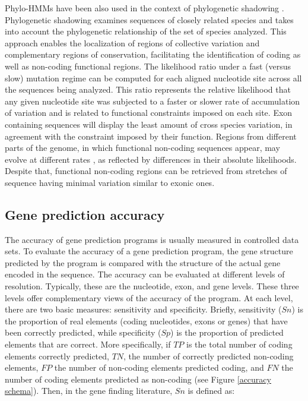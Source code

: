 Phylo-HMMs have been also used in the context of phylogenetic
shadowing \citep{boffelli:2003a}. Phylogenetic shadowing examines
sequences of closely related species and takes into account the
phylogenetic relationship of the set of species analyzed. This
approach enables the localization of regions of collective variation
and complementary regions of conservation, facilitating the
identification of coding as well as non-coding functional regions. The
likelihood ratio under a fast (versus slow) mutation regime can be
computed for each aligned nucleotide site across all the sequences
being analyzed. This ratio represents the relative likelihood that any
given nucleotide site was subjected to a faster or slower rate of
accumulation of variation and is related to functional constraints
imposed on each site. Exon containing sequences will display the least
amount of cross species variation, in agreement with the constraint
imposed by their function. Regions from different parts of the genome,
in which functional non-coding sequences appear, may evolve at
different rates \citep{eberseberger:2002a}, as reflected by
differences in their absolute likelihoods. Despite that, functional
non-coding regions can be retrieved from stretches of sequence having
minimal variation similar to exonic ones.

\subsection{Gene prediction accuracy}

The accuracy of gene prediction programs is usually measured in
controlled data sets. To evaluate the accuracy of a gene prediction
program, the gene structure predicted by the program is compared with
the structure of the actual gene encoded in the sequence. The accuracy
can be evaluated at different levels of resolution. Typically, these
are the nucleotide, exon, and gene levels. These three levels offer
complementary views of the accuracy of the program. At each level,
there are two basic measures: sensitivity and specificity. Briefly,
sensitivity ($Sn$) is the proportion of real elements (coding
nucleotides, exons or genes) that have been correctly predicted, while
specificity ($Sp$) is the proportion of predicted elements that are
correct. More specifically, if $TP$ is the total number of coding
elements correctly predicted, $TN$, the number of correctly predicted
non-coding elements, $FP$ the number of non-coding elements predicted
coding, and $FN$ the number of coding elements predicted as non-coding
(see Figure \ref{accuracy schema}).  Then, in the gene finding
literature, $Sn$ is defined as:

